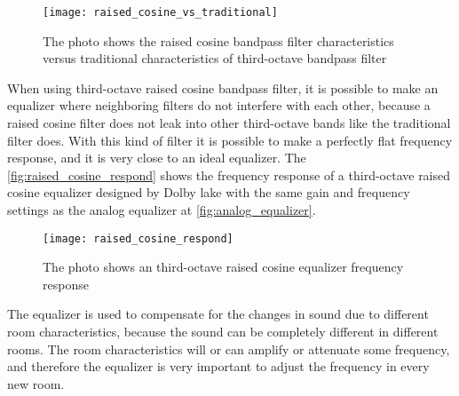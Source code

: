 \begin{figure} [htbp]
 \centering
  \texttt{[image: raised\_cosine\_vs\_traditional]}
  \caption{The photo shows the raised cosine bandpass filter characteristics versus traditional characteristics of third-octave bandpass filter %
  }
  \label{fig:raised_cosine_vs_traditional}
\end{figure}



When using third-octave raised cosine bandpass filter, it is possible to make an equalizer where neighboring filters do not interfere with each other, because a raised cosine filter does not leak into other third-octave bands like the traditional filter does. With this kind of filter it is possible to make a perfectly flat frequency response, and it is very close to an ideal equalizer. The \autoref{fig:raised_cosine_respond} shows the frequency response of a third-octave raised cosine equalizer designed by Dolby lake with the same gain and frequency settings as the analog equalizer at \autoref{fig:analog_equalizer}.

\begin{figure} [htbp]
 \centering
  \texttt{[image: raised\_cosine\_respond]}
  \caption{The photo shows an third-octave raised cosine equalizer frequency response  %
  }
  \label{fig:raised_cosine_respond}
\end{figure}


The equalizer is used to compensate for the changes in sound due to different room characteristics, because the sound can be completely different in different rooms. The room characteristics will or can amplify or attenuate some frequency, and therefore the equalizer is very important to adjust the frequency in every new room.\citep{howtogeek} 



